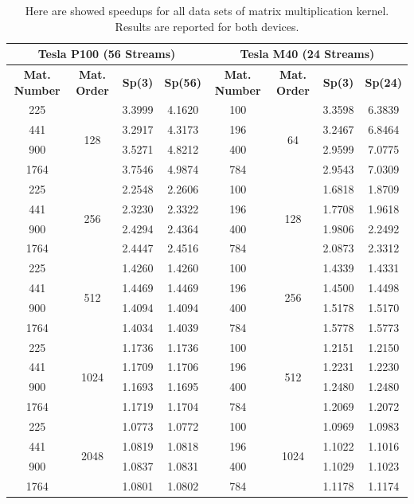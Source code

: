 \begin{table}	
	\centering
	\begin{tabular}{ | c | c | c | c  || c | c | c | c | } 
		\hline
		\multicolumn{4}{c}{\textbf{Tesla P100 (56 Streams)}} & \multicolumn{4}{c}{\textbf{Tesla M40 (24 Streams)}}\\ [0.5ex]
		\hline
		\textbf{Mat. Number}  & \textbf{Mat. Order} & \textbf{Sp(3)} & \textbf{Sp(56)} & \textbf{Mat. Number}  & \textbf{Mat. Order}  & \textbf{Sp(3)} & \textbf{Sp(24)} \\
		\hline\hline
		
		
		225& \multirow{4}{*}{128}&	3.3999&	4.1620&	100&	\multirow{4}{*}{64}&	3.3598&	6.3839\\
		441& &	3.2917&	4.3173&	196&	&	3.2467&	6.8464\\
		900& &	3.5271&	4.8212&	400&	&	2.9599&	7.0775\\
		1764& &	3.7546&	4.9874&	784&	&	2.9543&	7.0309\\
		\hline
		225& \multirow{4}{*}{256}&	2.2548&	2.2606&	100& \multirow{4}{*}{128}& 1.6818&	1.8709\\
		441& & 2.3230&	2.3322&	196& & 1.7708& 1.9618\\
		900& & 2.4294&	2.4364&	400& & 1.9806&	2.2492\\
		1764& &	2.4447&	2.4516&	784& & 2.0873&	2.3312\\
		\hline
		225& \multirow{4}{*}{512}&	1.4260&	1.4260&	100& \multirow{4}{*}{256}&	1.4339&	1.4331\\
		441& &	1.4469&	1.4469&	196&  & 1.4500&	1.4498\\
		900& &	1.4094&	1.4094&	400& &	1.5178&	1.5170\\
		1764& &	1.4034&	1.4039&	784& &	1.5778&	1.5773\\
		\hline
		225& \multirow{4}{*}{1024}&	1.1736&	1.1736&	100&	\multirow{4}{*}{512}&	1.2151&	1.2150\\
		441& &	1.1709&	1.1706&	196& & 1.2231&	1.2230\\
		900& &	1.1693&	1.1695&	400& &	1.2480&	1.2480\\
		1764& &	1.1719&	1.1704&	784& &	1.2069&	1.2072\\
		\hline
		225& \multirow{4}{*}{2048}&	1.0773&	1.0772&	100&	\multirow{4}{*}{1024}&	1.0969&	1.0983\\
		441& &	1.0819&	1.0818&	196& &	1.1022&	1.1016\\
		900& &	1.0837&	1.0831&	400& &	1.1029&	1.1023\\
		1764& &	1.0801&	1.0802&	784& &	1.1178&	1.1174\\
		
		\hline
		
		
	\end{tabular}
	\caption{Here are showed speedups for all data sets of matrix multiplication kernel. Results are reported for both devices.}	
	\label{tab:matspeedup}		
\end{table}
